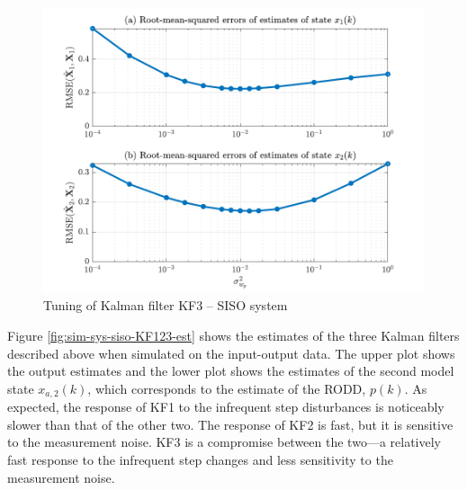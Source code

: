\begin{figure}[htp]
	\centering
	\includegraphics[width=13cm]{images/rod_obs_sim1_3KF_Q_seed_6.pdf}
	\caption{Tuning of Kalman filter KF3 – SISO system}
	\label{fig:sim-sys-siso-KF3-tuning}
\end{figure}
Figure \ref{fig:sim-sys-siso-KF123-est} shows the estimates of the three Kalman filters described above when simulated on the input-output data. The upper plot shows the output estimates and the lower plot shows the estimates of the second model state $x_{a,2}(k)$, which corresponds to the estimate of the \gls{RODD}, $p(k)$. As expected, the response of KF1 to the infrequent step disturbances is noticeably slower than that of the other two. The response of KF2 is fast, but it is sensitive to the measurement noise. KF3 is a compromise between the two—a relatively fast response to the infrequent step changes and less sensitivity to the measurement noise.

